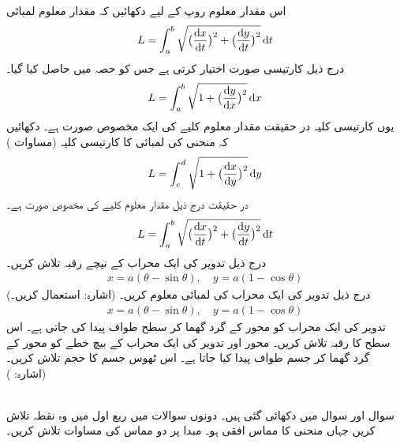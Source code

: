 اس مقدار معلوم روپ کے لیے دکھائیں کہ مقدار معلوم لمبائی
\begin{align*}
L=\int_a^b\sqrt{\big(\frac{\dif x}{\dif t}\big)^2+\big(\frac{\dif y}{\dif t}\big)^2}\dif t
\end{align*}
درج ذیل کارتیسی صورت اختیار کرتی ہے جس کو حصہ  میں حاصل کیا گیا۔
\begin{align*}
L=\int_a^b\sqrt{1+\big(\frac{\dif y}{\dif x}\big)^2}\dif x
\end{align*}
یوں کارتیسی کلیہ در حقیقت مقدار معلوم کلیے  کی ایک مخصوص صورت ہے۔
دکھائیں کہ منحنی  کی لمبائی کا کارتیسی کلیہ (مساوات )
\begin{align*}
L=\int_c^d\sqrt{1+\big(\frac{\dif x}{\dif y}\big)^2}\dif y
\end{align*}
در حقیقت درج ذیل مقدار  معلوم کلیے کی مخصوص صورت ہے۔
\begin{align*}
L=\int_a^b\sqrt{\big(\frac{\dif x}{\dif t}\big)^2+\big(\frac{\dif y}{\dif t}\big)^2}\dif t
\end{align*}
درج ذیل تدویر کی ایک محراب کے نیچے رقبہ تلاش کریں۔
\begin{align*}
x=a(\theta-\sin\theta),\quad y=a(1-\cos\theta)
\end{align*} \quad
(اشارہ: استعمال کریں۔)
درج ذیل تدویر کی ایک محراب کی لمبائی معلوم کریں۔
\begin{align*}
x=a(\theta-\sin\theta),\quad y=a(1-\cos\theta)
\end{align*}
تدویر  کی ایک محراب کو محور  کے گرد گھما کر سطح طواف پیدا کی جاتی ہے۔ اس سطح کا رقبہ تلاش کریں۔
محور  اور تدویر  کی  ایک محراب کے بیچ خطے  کو محور  کے گرد گھما کر جسم طواف پیدا کیا جاتا ہے۔ اس ٹھوس جسم کا حجم تلاش کریں۔ (اشارہ: )

\\
سوال  اور سوال  میں  دکھائی گئی ہیں۔  دونوں سوالات میں ربع اول میں وہ نقطہ تلاش کریں جہاں منحنی کا مماس افقی ہو۔ مبدا پر دو مماس کی مساوات تلاش کریں۔

